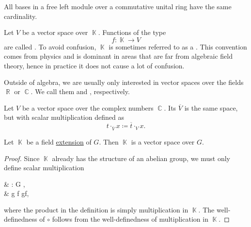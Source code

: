 \begin{proposition}\label{thm:left_module_basis_cardinality}
  All bases in a free left module over a commutative unital ring have the same cardinality.
\end{proposition}

\begin{definition}\label{def:vector_field}
  Let \( V \) be a vector space over \( \BbbK \). Functions of the type
  \begin{equation*}
    f: \BbbK \to V
  \end{equation*}
  are called . To avoid confusion, \( \BbbK \) is sometimes referred to as a . This convention comes from physics and is dominant in areas that are far from algebraic field theory, hence in practice it does not cause a lot of confusion.
\end{definition}

\begin{remark}\label{rem:real_vector_space}
  Outside of algebra, we are usually only interested in vector spaces over the fields \( \BbbR \) or \( \BbbC \). We call them  and , respectively.
\end{remark}

\begin{definition}\label{def:complex_conjucate_vector_space}
  Let \( V \) be a vector space over the complex numbers \( \BbbC \). Its  \( \overline V \) is the same space, but with scalar multiplication defined as
  \begin{equation*}
    t \cdot_{\overline V} x \coloneqq \overline t \cdot_V x.
  \end{equation*}
\end{definition}

\begin{proposition}\label{thm:field_extension_is_vector_space}
  Let \( \BbbK \) be a field \hyperref[def:field_extension]{extension} of \( G \). Then \( \BbbK \) is a vector space over \( G \).
\end{proposition}
\begin{proof}
  Since \( \BbbK \) already has the structure of an abelian group, we must only define scalar multiplication
  \begin{balign*}
     & \circ: G \times \BbbK \to \BbbK, \\
     & g \circ f \coloneqq gf,
  \end{balign*}
  where the product in the definition is simply multiplication in \( \BbbK \). The well-definedness of \( \circ \) follows from the well-definedness of multiplication in \( \BbbK \).
\end{proof}

